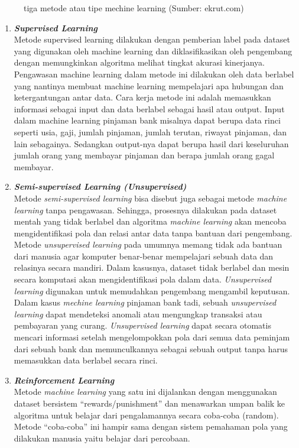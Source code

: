 \begin{enumerate}
\begin{figure} [ht]
      \caption{tiga metode atau tipe mechine learning (Sumber: ekrut.com)}
      \label{fig:MechineLearning}
    \end{figure}
    \begin{enumerate}[nolistsep]
      \item \textit{\textbf{Supervised Learning}}\\
        Metode supervised learning dilakukan dengan pemberian label pada dataset  yang digunakan oleh machine learning dan diklasifikasikan oleh pengembang dengan memungkinkan algoritma melihat tingkat akurasi kinerjanya. Pengawasan machine learning dalam metode ini dilakukan oleh data berlabel yang nantinya membuat machine learning mempelajari apa hubungan dan ketergantungan antar data.
        Cara kerja metode ini adalah memasukkan informasi sebagai input dan data berlabel sebagai hasil atau output. Input dalam machine learning pinjaman bank misalnya dapat berupa data rinci seperti usia, gaji, jumlah pinjaman, jumlah terutan, riwayat pinjaman, dan lain sebagainya. Sedangkan output-nya dapat berupa hasil dari keseluruhan jumlah orang yang membayar pinjaman dan berapa jumlah orang gagal membayar.
      \item \textit{\textbf{Semi-supervised Learning (Unsupervised)}} \\
        Metode \textit{semi-supervised learning} bisa disebut juga sebagai metode \textit{machine learning} tanpa pengawasan. Sehingga, prosesnya dilakukan pada dataset mentah yang tidak berlabel dan algoritma \textit{machine learning} akan mencoba mengidentifikasi pola dan relasi antar data tanpa bantuan dari pengembang.
        Metode \textit{unsupervised learning} pada umumnya memang tidak ada bantuan dari manusia agar komputer benar-benar mempelajari sebuah data dan relasinya secara mandiri. Dalam kasusnya, dataset tidak berlabel dan mesin secara komputasi akan mengidentifikasi pola dalam data. \textit{Unsupervised learning} digunakan untuk memudahkan pengembang mengambil keputusan.
        Dalam kasus \textit{mechine learning} pinjaman bank tadi, sebuah \textit{unsupervised learning} dapat mendeteksi anomali atau mengungkap transaksi atau pembayaran yang curang. \textit{Unsupervised learning}  dapat secara otomatis mencari informasi setelah mengelompokkan pola dari semua data peminjam dari sebuah bank dan memunculkannya sebagai sebuah output tanpa harus memasukkan data berlabel secara rinci.
      \item \textit{\textbf{Reinforcement Learning}} \\
        Metode \textit{machine learning} yang satu ini dijalankan dengan menggunakan dataset bersistem “rewards/punishment” dan menawarkan umpan balik ke algoritma untuk belajar dari pengalamannya secara coba-coba (random). Metode “coba-coba” ini hampir sama dengan sistem pemahaman pola yang dilakukan manusia yaitu belajar dari percobaan.


\end{enumerate}
\end{enumerate}
